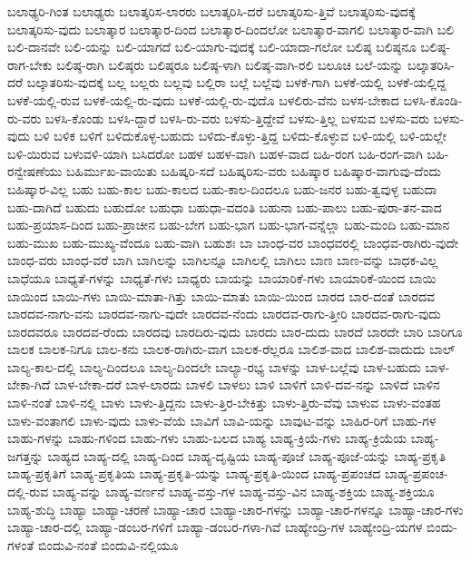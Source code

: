 {ಬಲಾಢ್ಯರಿ-ಗಿಂತ
ಬಲಾಢ್ಯರು
ಬಲಾತ್ಕರಿಸ-ಲಾರರು
ಬಲಾತ್ಕರಿಸಿ-ದರೆ
ಬಲಾತ್ಕರಿಸು-ತ್ತಿವೆ
ಬಲಾತ್ಕರಿಸು-ವುದಕ್ಕೆ
ಬಲಾತ್ಕರಿಸು-ವುದು
ಬಲಾತ್ಕಾರ
ಬಲಾತ್ಕಾರ-ದಿಂದ
ಬಲಾತ್ಕಾರ-ದಿಂದಲೋ
ಬಲಾತ್ಕಾರ-ವಾಗಲಿ
ಬಲಾತ್ಕಾರ-ವಾಗಿ
ಬಲಿ
ಬಲಿ-ದಾನವೇ
ಬಲಿ-ಯನ್ನು
ಬಲಿ-ಯಾಗದೆ
ಬಲಿ-ಯಾಗು-ವುದಕ್ಕೆ
ಬಲಿ-ಯಾದಾ-ಗಲೋ
ಬಲಿಷ್ಠ
ಬಲಿಷ್ಠನೂ
ಬಲಿಷ್ಠ-ರಾಗ-ಬೇಕು
ಬಲಿಷ್ಠ-ರಾಗಿ
ಬಲಿಷ್ಠರು
ಬಲಿಷ್ಠರೂ
ಬಲಿಷ್ಠ-ಳಾಗಿ
ಬಲಿಷ್ಠ-ವಾಗಿ-ರಲಿ
ಬಲೂಚಿ
ಬಲೆ-ಯನ್ನು
ಬಲ್ಕಾತರಿಸಿ-ದರೆ
ಬಲ್ಕಾತರಿಸು-ವುದಕ್ಕೆ
ಬಲ್ಲ
ಬಲ್ಲರು
ಬಲ್ಲವು
ಬಲ್ಲಿರಾ
ಬಲ್ಲೆ
ಬಲ್ಲೆವು
ಬಳಕೆ-ಗಾಗಿ
ಬಳಕೆ-ಯಲ್ಲಿ
ಬಳಕೆ-ಯಲ್ಲಿದ್ದ
ಬಳಕೆ-ಯಲ್ಲಿ-ರುವ
ಬಳಕೆ-ಯಲ್ಲಿ-ರು-ವುದು
ಬಳಕೆ-ಯಲ್ಲಿ-ರು-ವುದೊ
ಬಳಲಿರು-ವೆನು
ಬಳಸ-ಬೇಕಾದ
ಬಳಸಿ-ಕೊಂಡಿ-ರು-ವರು
ಬಳಸಿ-ಕೊಂಡು
ಬಳಸಿ-ದ್ದಾರೆ
ಬಳಸಿ-ರು-ವರು
ಬಳಸು-ತ್ತಿದ್ದೇವೆ
ಬಳಸು-ತ್ತಿಲ್ಲ
ಬಳಸುವ
ಬಳಸು-ವರು
ಬಳಸು-ವುದು
ಬಳಿ
ಬಳಿಕ
ಬಳಿಗೆ
ಬಳಿದುಕೊಳ್ಳ-ಬಹುದು
ಬಳಿದು-ಕೊಳ್ಳು-ತ್ತಿದ್ದ
ಬಳಿದು-ಕೊಳ್ಳುವ
ಬಳಿ-ಯಲ್ಲಿ
ಬಳಿ-ಯಲ್ಲೇ
ಬಳಿ-ಯಿರುವ
ಬಳುವಳಿ-ಯಾಗಿ
ಬಸಿದರೋ
ಬಹಳ
ಬಹಳ-ವಾಗಿ
ಬಹಳ-ವಾದ
ಬಹಿ-ರಂಗ
ಬಹಿ-ರಂಗ-ವಾಗಿ
ಬಹಿ-ರನ್ವೇಷಣೆಯು
ಬಹಿರ್ಮುಖ-ವಾಯಿತು
ಬಹಿಷ್ಕರಿ-ಸದೆ
ಬಹಿಷ್ಕರಿಸು-ವರು
ಬಹಿಷ್ಕಾರ
ಬಹಿಷ್ಕಾರ-ವಾಗುವು-ದೆಂದು
ಬಹಿಷ್ಕಾರ-ವಿಲ್ಲ
ಬಹು
ಬಹು-ಕಾಲ
ಬಹು-ಕಾಲದ
ಬಹು-ಕಾಲ-ದಿಂದಲೂ
ಬಹು-ಜನರ
ಬಹು-ತ್ವವುಳ್ಳ
ಬಹುದಾ
ಬಹು-ದಾಗಿದೆ
ಬಹುದು
ಬಹುದೋ
ಬಹುಧಾ
ಬಹುಧಾ-ವದಂತಿ
ಬಹುನಾ
ಬಹು-ಪಾಲು
ಬಹು-ಪುರಾ-ತನ-ವಾದ
ಬಹು-ಪ್ರಯಾಸ-ದಿಂದ
ಬಹು-ಪ್ರಾಚೀನ
ಬಹು-ಬೇಗ
ಬಹು-ಭಾಗ
ಬಹು-ಭಾಗ-ವನ್ನೆಲ್ಲಾ
ಬಹು-ಮಂದಿ
ಬಹು-ಮಾನ
ಬಹು-ಮುಖ
ಬಹು-ಮುಖ್ಯ-ವೆಂದೂ
ಬಹು-ವಾಗಿ
ಬಹುಶಃ
ಬಾ
ಬಾಂಧ-ವರ
ಬಾಂಧವರಲ್ಲಿ
ಬಾಂಧವ-ರಾಗಿರು-ವುದೇ
ಬಾಂಧ-ವರು
ಬಾಂಧ-ವರೆ
ಬಾಗಿ
ಬಾಗಿಲನ್ನು
ಬಾಗಿಲನ್ನೂ
ಬಾಗಿಲಲ್ಲಿ
ಬಾಗಿಲು
ಬಾಣ
ಬಾಣ-ವನ್ನು
ಬಾಧಕ-ವಿಲ್ಲ
ಬಾಧೆಯೂ
ಬಾಧ್ಯತೆ-ಗಳನ್ನು
ಬಾಧ್ಯತೆ-ಗಳು
ಬಾಧ್ಯರು
ಬಾಯನ್ನು
ಬಾಯಾರಿಕೆ-ಗಳು
ಬಾಯಾರಿಕೆ-ಯಿಂದ
ಬಾಯಿ
ಬಾಯಿಂದ
ಬಾಯಿ-ಗಳು
ಬಾಯಿ-ಮಾತಾ-ಗಿತ್ತು
ಬಾಯಿ-ಮಾತು
ಬಾಯಿ-ಯಿಂದ
ಬಾರದ
ಬಾರ-ದಂತೆ
ಬಾರದವ
ಬಾರದವ-ನಾಗು-ವನು
ಬಾರದವ-ನಾಗು-ವುದೇ
ಬಾರದವ-ನೆಂದು
ಬಾರದವ-ರಾಗು-ತ್ತೀರಿ
ಬಾರದವ-ರಾಗು-ವುದು
ಬಾರದವರೂ
ಬಾರದವ-ರೆಂದು
ಬಾರದವು
ಬಾರದಿರು-ವುದು
ಬಾರದು
ಬಾರ-ದುದು
ಬಾರದೆ
ಬಾರದೇ
ಬಾರಿ
ಬಾರಿಗೂ
ಬಾಲಕ
ಬಾಲಕ-ನಿಗೂ
ಬಾಲ-ಕನು
ಬಾಲಕ-ರಾಗಿರು-ವಾಗ
ಬಾಲಕ-ರೆಲ್ಲರೂ
ಬಾಲಿಶ-ವಾದ
ಬಾಲಿಶ-ವಾದುದು
ಬಾಲ್
ಬಾಲ್ಯ-ಕಾಲ-ದಲ್ಲಿ
ಬಾಲ್ಯ-ದಿಂದಲೂ
ಬಾಲ್ಯ-ದಿಂದಲೇ
ಬಾಲ್ಯಾ-ರಭ್ಯ
ಬಾಳನ್ನು
ಬಾಳ-ಬಲ್ಲೆವು
ಬಾಳ-ಬಹುದು
ಬಾಳ-ಬೇಕಾ-ಗಿದೆ
ಬಾಳ-ಬೇಕಾ-ದರೆ
ಬಾಳ-ಲಾರದು
ಬಾಳಲಿ
ಬಾಳಲು
ಬಾಳಿ
ಬಾಳಿಗೆ
ಬಾಳಿ-ದವ-ನನ್ನು
ಬಾಳಿದೆ
ಬಾಳಿನ
ಬಾಳಿ-ನಂತೆ
ಬಾಳಿ-ನಲ್ಲಿ
ಬಾಳು
ಬಾಳು-ತ್ತಿದ್ದನು
ಬಾಳು-ತ್ತಿರ-ಬೇಕಿತ್ತು
ಬಾಳು-ತ್ತಿರು-ವೆವು
ಬಾಳುವ
ಬಾಳು-ವಂತಹ
ಬಾಳು-ವಂತಾಗಲಿ
ಬಾಳು-ವುದು
ಬಾಳು-ವೆಯೆ
ಬಾವಿಗೆ
ಬಾವಿ-ಯನ್ನು
ಬಾವುಟ-ವನ್ನು
ಬಾಹಿರ-ರಿಗೆ
ಬಾಹು-ಗಳ
ಬಾಹು-ಗಳನ್ನು
ಬಾಹು-ಗಳಿಂದ
ಬಾಹು-ಗಳು
ಬಾಹು-ಬಲದ
ಬಾಹ್ಯ
ಬಾಹ್ಯ-ಕ್ರಿಯೆ-ಗಳು
ಬಾಹ್ಯ-ಕ್ರಿಯೆಯ
ಬಾಹ್ಯ-ಜಗತ್ತನ್ನು
ಬಾಹ್ಯದ
ಬಾಹ್ಯ-ದಲ್ಲಿ
ಬಾಹ್ಯ-ದಿಂದ
ಬಾಹ್ಯ-ದೃಷ್ಟಿಯ
ಬಾಹ್ಯ-ಪೂಜೆ
ಬಾಹ್ಯ-ಪೂಜೆ-ಯನ್ನು
ಬಾಹ್ಯ-ಪ್ರಕೃತಿ
ಬಾಹ್ಯ-ಪ್ರಕೃತಿಗೆ
ಬಾಹ್ಯ-ಪ್ರಕೃತಿಯ
ಬಾಹ್ಯ-ಪ್ರಕೃತಿ-ಯನ್ನು
ಬಾಹ್ಯ-ಪ್ರಕೃತಿ-ಯಿಂದ
ಬಾಹ್ಯ-ಪ್ರಪಂಚದ
ಬಾಹ್ಯ-ಪ್ರಪಂಚ-ದಲ್ಲಿ-ರುವ
ಬಾಹ್ಯ-ವನ್ನು
ಬಾಹ್ಯ-ವರ್ಣನೆ
ಬಾಹ್ಯ-ವಸ್ತು-ಗಳ
ಬಾಹ್ಯ-ವಸ್ತು-ವಿನ
ಬಾಹ್ಯ-ಶಕ್ತಿಯ
ಬಾಹ್ಯ-ಶಕ್ತಿಯೂ
ಬಾಹ್ಯ-ಶುದ್ಧಿ
ಬಾಹ್ಯಾ
ಬಾಹ್ಯಾ-ಚರಣೆ
ಬಾಹ್ಯಾ-ಚಾರ
ಬಾಹ್ಯಾ-ಚಾರ-ಗಳನ್ನು
ಬಾಹ್ಯಾ-ಚಾರ-ಗಳನ್ನೂ
ಬಾಹ್ಯಾ-ಚಾರ-ಗಳು
ಬಾಹ್ಯಾ-ಚಾರ-ದಲ್ಲಿ
ಬಾಹ್ಯಾ-ಡಂಬರ-ಗಳಿಗೆ
ಬಾಹ್ಯಾ-ಡಂಬರ-ಗಳಾ-ಗಿವೆ
ಬಾಹ್ಯೇಂದ್ರಿ-ಗಳ
ಬಾಹ್ಯೇಂದ್ರಿ-ಯಗಳ
ಬಿಂದು-ಗಳಂತೆ
ಬಿಂದುವಿ-ನಂತೆ
ಬಿಂದುವಿ-ನಲ್ಲಿಯೂ
}

